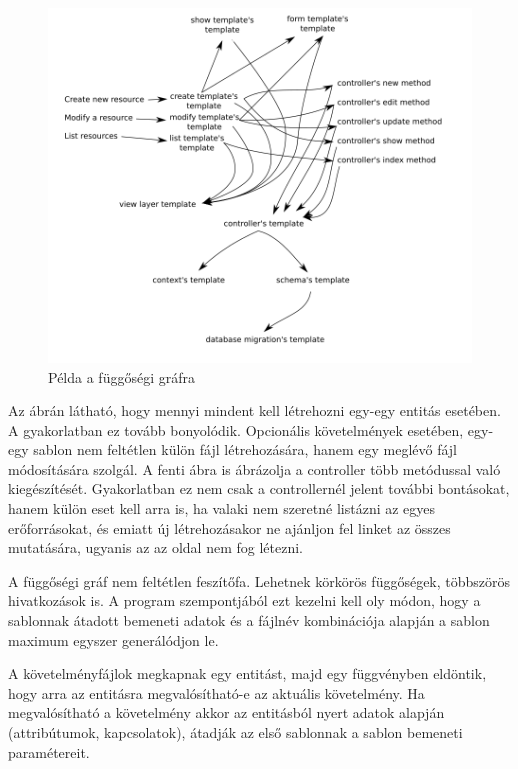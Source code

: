 \documentclass[a4paper,12pt,oneside]{report}
\begin{document}
\begin{justify}
	\begin{figure}[h]
		\includegraphics[width=\textwidth]{contents/images/dependecy_graph.png}
		\caption{Példa a függőségi gráfra}
		\label{fig:dependecy_graph}
	\end{figure}

	Az ábrán látható, hogy mennyi mindent kell létrehozni egy-egy entitás esetében. A gyakorlatban ez tovább bonyolódik. Opcionális követelmények esetében, egy-egy sablon nem feltétlen külön fájl létrehozására, hanem egy meglévő fájl módosítására szolgál. A fenti ábra is ábrázolja a controller több metódussal való kiegészítését. Gyakorlatban ez nem csak a controllernél jelent további bontásokat, hanem külön eset kell arra is, ha valaki nem szeretné listázni az egyes erőforrásokat, és emiatt új létrehozásakor ne ajánljon fel linket az összes mutatására, ugyanis az az oldal nem fog létezni.

	A függőségi gráf nem feltétlen feszítőfa. Lehetnek körkörös függőségek, többszörös hivatkozások is. A program szempontjából ezt kezelni kell oly módon, hogy a sablonnak átadott bemeneti adatok és a fájlnév kombinációja alapján a sablon maximum egyszer generálódjon le.

	A követelményfájlok megkapnak egy entitást, majd egy függvényben eldöntik, hogy arra az entitásra megvalósítható-e az aktuális követelmény. Ha megvalósítható a követelmény akkor az entitásból nyert adatok alapján (attribútumok, kapcsolatok), átadják az első sablonnak a sablon bemeneti paramétereit.


\end{justify}
\end{document}
